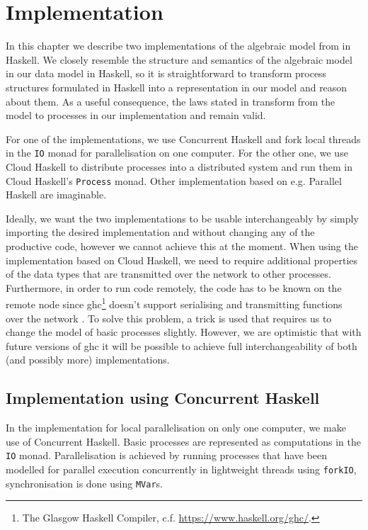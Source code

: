 \chapter{Implementation}
In this chapter we describe two implementations of the algebraic model from  in \textsf{Haskell}. We closely resemble the structure and semantics of the algebraic model in our data model in \textsf{Haskell}, so it is straightforward to transform process structures formulated in \textsf{Haskell} into a representation in our model and reason about them. As a useful consequence, the laws stated in  transform from the model to processes in our implementation and remain valid.

For one of the implementations, we use \textsf{Concurrent Haskell} and fork local threads in the \texttt{IO} monad for parallelisation on one computer. For the other one, we use \textsf{Cloud Haskell} to distribute processes into a distributed system and run them in \textsf{Cloud Haskell}'s \texttt{Process} monad. Other implementation based on e.g. \textsf{Parallel Haskell} are imaginable.

Ideally, we want the two implementations to be usable interchangeably by simply importing the desired implementation and without changing any of the productive code, however we cannot achieve this at the moment. When using the implementation based on \textsf{Cloud Haskell}, we need to require additional properties of the data types that are transmitted over the network to other processes. Furthermore, in order to run code remotely, the code has to be known on the remote node since \textsf{ghc}\footnote{The Glasgow Haskell Compiler, c.f. \url{https://www.haskell.org/ghc/}.} doesn't support serialising and transmitting functions over the network \cite{Epstein:2011:THC:2034675.2034690}. To solve this problem, a trick is used that requires us to change the model of basic processes slightly. However, we are optimistic that with future versions of \textsf{ghc} it will be possible to achieve full interchangeability of both (and possibly more) implementations.



\clearpage

\section{Implementation using Concurrent Haskell}
\label{chp:local}
In the implementation for local parallelisation on only one computer, we make use of \textsf{Concurrent Haskell}. Basic processes are represented as computations in the \texttt{IO} monad. Parallelisation is achieved by running processes that have been modelled for parallel execution concurrently in lightweight threads using \texttt{forkIO}, synchronisation is done using \texttt{MVar}s.

